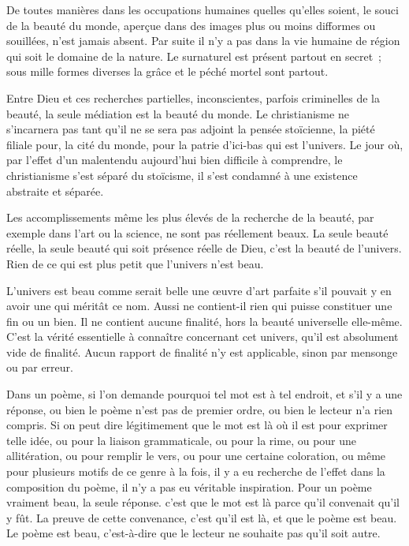 \documentclass[french,twoside]{book} %
\begin{document}
De toutes manières dans les occupations humaines quelles qu'elles soient, le souci de la beauté du monde, aperçue dans des images plus ou moins difformes ou souillées, n'est jamais absent. Par suite il n'y a pas dans la vie humaine de région qui soit le domaine de la nature. Le surnaturel est présent partout en secret ; sous mille formes diverses la grâce et le péché mortel sont partout.\par
Entre Dieu et ces recherches partielles, inconscientes, parfois criminelles de la beauté, la seule médiation est la beauté du monde. Le christianisme ne s'incarnera pas tant qu'il ne se sera pas adjoint la pensée stoïcienne, la piété filiale pour, la cité du monde, pour la patrie d'ici-bas qui est l'univers. Le jour où, par l'effet d'un malentendu aujourd'hui bien difficile à comprendre, le christianisme s'est séparé du stoïcisme, il s'est condamné à une existence abstraite et séparée.\par
Les accomplissements même les plus élevés de la recherche de la beauté, par exemple dans l'art ou la science, ne sont pas réellement beaux. La seule beauté réelle, la seule beauté qui soit présence réelle de Dieu, c'est la beauté de l'univers. Rien de ce qui est plus petit que l'univers n'est beau.\par
L'univers est beau comme serait belle une œuvre d'art parfaite s'il pouvait y en avoir une qui méritât ce nom. Aussi ne contient-il rien qui puisse constituer une fin ou un bien. Il ne contient aucune finalité, hors la beauté universelle elle-même. C'est la vérité essentielle à connaître concernant cet univers, qu'il est absolument vide de finalité. Aucun rapport de finalité n'y est applicable, sinon par mensonge ou par erreur.\par
Dans un poème, si l'on demande pourquoi tel mot est à tel endroit, et s'il y a une réponse, ou bien le poème n'est pas de premier ordre, ou bien le lecteur n'a rien compris. Si on peut dire légitimement que le mot est là où il est pour exprimer telle idée, ou pour la liaison grammaticale, ou pour la rime, ou pour une allitération, ou pour remplir le vers, ou pour une certaine coloration, ou même pour plusieurs motifs de ce genre à la fois, il y a eu recherche de l'effet dans la composition du poème, il n'y a pas eu véritable inspiration. Pour un poème vraiment beau, la seule réponse. c'est que le mot est là parce qu'il convenait qu'il y fût. La preuve de cette convenance, c'est qu'il est là, et que le poème est beau. Le poème est beau, c'est-à-dire que le lecteur ne souhaite pas qu'il soit autre.\par
\end{document}
